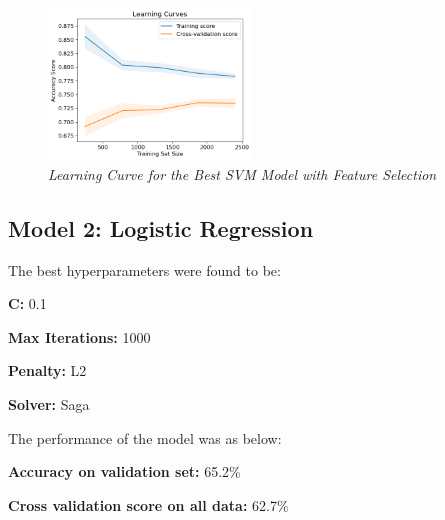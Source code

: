\begin{figure}[!ht]
    \includegraphics[width = 0.48\textwidth]{res/svm-ft-lc.png}
    \caption{\textit{Learning Curve for the Best SVM Model with Feature Selection}}
    \label{fig:svm-ft-lc}
\end{figure}


\subsection{Model 2: Logistic Regression}
The best hyperparameters were found to be:

\textbf{C: } 0.1

\textbf{Max Iterations: } 1000

\textbf{Penalty: } L2

\textbf{Solver: } Saga

\noindent
The performance of the model was as below:

\noindent
\textbf{Accuracy on validation set:} 65.2\%

\noindent
\textbf{Cross validation score on all data:} 62.7\%  

